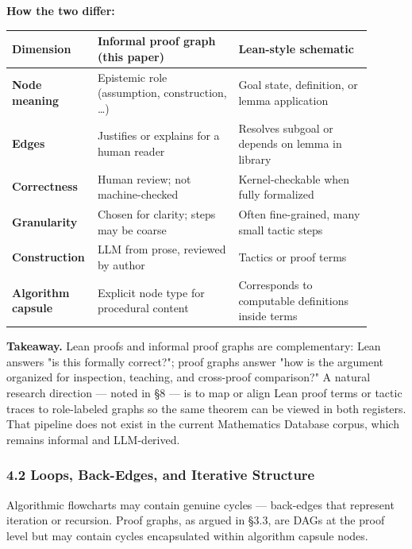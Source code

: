 \documentclass[
  11pt]{article}
\begin{document}
\textbf{How the two differ:}

\begin{longtable}[]{@{}>{\raggedright\arraybackslash}p{0.16\linewidth}>{\raggedright\arraybackslash}p{0.38\linewidth}>{\raggedright\arraybackslash}p{0.36\linewidth}@{}}
\toprule\noalign{}
Dimension & Informal proof graph (this paper) & Lean-style schematic \\
\midrule\noalign{}
\endhead
\bottomrule\noalign{}
\endlastfoot
\textbf{Node meaning} & Epistemic role (assumption, construction,
\ldots) & Goal state, definition, or lemma application \\
\textbf{Edges} & Justifies or explains for a human reader & Resolves
subgoal or depends on lemma in library \\
\textbf{Correctness} & Human review; not machine-checked &
Kernel-checkable when fully formalized \\
\textbf{Granularity} & Chosen for clarity; steps may be coarse & Often
fine-grained, many small tactic steps \\
\textbf{Construction} & LLM from prose, reviewed by author & Tactics or
proof terms \\
\textbf{Algorithm capsule} & Explicit node type for procedural content &
Corresponds to computable definitions inside terms \\
\end{longtable}

\textbf{Takeaway.} Lean proofs and informal proof graphs are
complementary: Lean answers "is this formally correct?"; proof graphs
answer "how is the argument organized for inspection, teaching, and
cross-proof comparison?" A natural research direction --- noted in §8
--- is to map or align Lean proof terms or tactic traces to role-labeled
graphs so the same theorem can be viewed in both registers. That
pipeline does not exist in the current Mathematics Database corpus,
which remains informal and LLM-derived.

\hypertarget{42-loops-back-edges-and-iterative-structure}{%
\subsubsection{4.2 Loops, Back-Edges, and Iterative
Structure}\label{42-loops-back-edges-and-iterative-structure}}

Algorithmic flowcharts may contain genuine cycles --- back-edges that
represent iteration or recursion. Proof graphs, as argued in §3.3, are
DAGs at the proof level but may contain cycles encapsulated within
algorithm capsule nodes.
\end{document}
